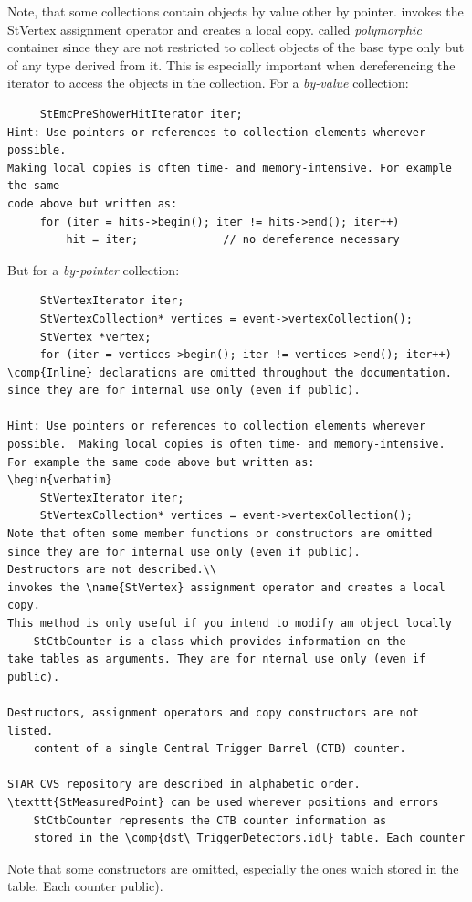 Note, that some collections contain objects by value other by pointer.
invokes the StVertex assignment operator and creates a local copy.
called \textit{polymorphic} container since they are not restricted to
collect objects of the base type only but of any type derived from
it. This is especially important when dereferencing the iterator to
access the objects in the collection.  For a \textit{by-value}
collection:
\begin{verbatim}
     StEmcPreShowerHitIterator iter;
Hint: Use pointers or references to collection elements wherever possible.
Making local copies is often time- and memory-intensive. For example the same
code above but written as:
     for (iter = hits->begin(); iter != hits->end(); iter++)
         hit = iter;             // no dereference necessary
\end{verbatim}
But for a \textit{by-pointer} collection:
\begin{verbatim}
     StVertexIterator iter;
     StVertexCollection* vertices = event->vertexCollection();
     StVertex *vertex;
     for (iter = vertices->begin(); iter != vertices->end(); iter++)
\comp{Inline} declarations are omitted throughout the documentation.
since they are for internal use only (even if public). 

Hint: Use pointers or references to collection elements wherever
possible.  Making local copies is often time- and memory-intensive.
For example the same code above but written as:
\begin{verbatim}
     StVertexIterator iter;
     StVertexCollection* vertices = event->vertexCollection();
Note that often some member functions or constructors are omitted
since they are for internal use only (even if public).
Destructors are not described.\\
invokes the \name{StVertex} assignment operator and creates a local copy.
This method is only useful if you intend to modify am object locally
    StCtbCounter is a class which provides information on the
take tables as arguments. They are for nternal use only (even if public).

Destructors, assignment operators and copy constructors are not listed.
    content of a single Central Trigger Barrel (CTB) counter.  
    
STAR CVS repository are described in alphabetic order.
\texttt{StMeasuredPoint} can be used wherever positions and errors
    StCtbCounter represents the CTB counter information as
    stored in the \comp{dst\_TriggerDetectors.idl} table. Each counter
\end{verbatim}
Note that some constructors are omitted, especially the ones which
    stored in the  table. Each counter
public).

